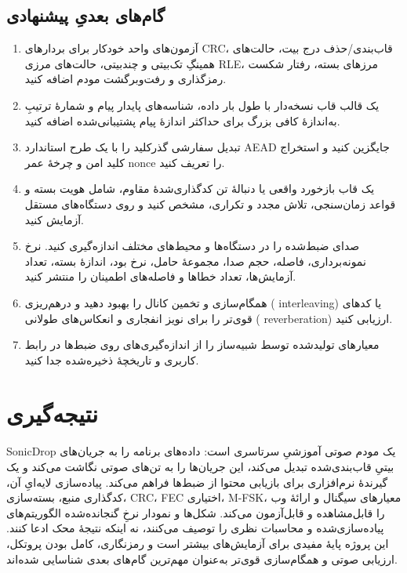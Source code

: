 \documentclass[12pt,a4paper]{article}
\providecommand{\lr}[1]{\foreignlanguage{english}{\begingroup\hyphenchar\font=-1 #1\endgroup}}
\begin{document}
\subsection{گام‌های بعدیِ پیشنهادی}
\begin{enumerate}
    \item آزمون‌های واحد خودکار برای بردارهای \lr{CRC}، قاب‌بندی/حذف درج بیت، حالت‌های همینگِ تک‌بیتی و چندبیتی، حالت‌های مرزی \lr{RLE}، مرزهای بسته، رفتار شکست رمزگذاری و رفت‌وبرگشت مودم اضافه کنید.
    \item یک قالب قاب نسخه‌دار با طول بار داده، شناسه‌های پایدار پیام و شمارۀ ترتیبِ به‌اندازۀ کافی بزرگ برای حداکثر اندازۀ پیام پشتیبانی‌شده اضافه کنید.
    \item تبدیل سفارشی گذرکلید را با یک طرح استاندارد \lr{AEAD} جایگزین کنید و استخراج کلید امن و چرخۀ عمر \lr{nonce} را تعریف کنید.
    \item یک قاب بازخورد واقعی یا دنبالۀ تن کدگذاری‌شدۀ مقاوم، شامل هویت بسته و قواعد زمان‌سنجی، تلاش مجدد و تکراری، مشخص کنید و روی دستگاه‌های مستقل آزمایش کنید.
    \item صدای ضبط‌شده را در دستگاه‌ها و محیط‌های مختلف اندازه‌گیری کنید. نرخ نمونه‌برداری، فاصله، حجم صدا، مجموعۀ حامل، نرخ بود، اندازۀ بسته، تعداد آزمایش‌ها، تعداد خطاها و فاصله‌های اطمینان را منتشر کنید.
    \item همگام‌سازی و تخمین کانال را بهبود دهید و درهم‌ریزی (\lr{interleaving}) یا کدهای قوی‌تر را برای نویز انفجاری و انعکاس‌های طولانی (\lr{reverberation}) ارزیابی کنید.
    \item معیارهای تولیدشده توسط شبیه‌ساز را از اندازه‌گیری‌های روی ضبط‌ها در رابط کاربری و تاریخچۀ ذخیره‌شده جدا کنید.
\end{enumerate}

\section{نتیجه‌گیری}
\label{sec:conclusion}

\lr{SonicDrop} یک مودم صوتی آموزشیِ سرتاسری است: داده‌های برنامه را به جریان‌های بیتیِ قاب‌بندی‌شده تبدیل می‌کند، این جریان‌ها را به تن‌های صوتی نگاشت می‌کند و یک گیرندۀ نرم‌افزاری برای بازیابی محتوا از ضبط‌ها فراهم می‌کند. پیاده‌سازی لایه‌ایِ آن، کدگذاری منبع، بسته‌سازی، \lr{CRC}، \lr{FEC} اختیاری، \lr{M-FSK}، معیارهای سیگنال و ارائۀ وب را قابل‌مشاهده و قابل‌آزمون می‌کند. شکل‌ها و نمودار نرخِ گنجانده‌شده الگوریتم‌های پیاده‌سازی‌شده و محاسبات نظری را توصیف می‌کنند، نه اینکه نتیجۀ محک ادعا کنند. این پروژه پایۀ مفیدی برای آزمایش‌های بیشتر است و رمزنگاری، کامل بودن پروتکل، ارزیابی صوتی و همگام‌سازی قوی‌تر به‌عنوان مهم‌ترین گام‌های بعدی شناسایی شده‌اند.
\end{document}
